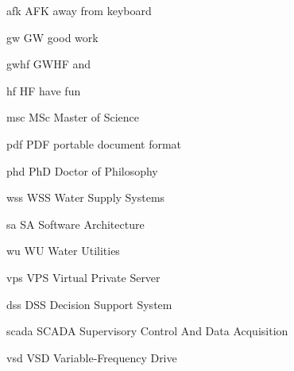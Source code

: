 \newabbreviation
{afk}
{AFK}
{away from keyboard}

\newabbreviation
{gw}
{GW}
{good work}

\newabbreviation
{gwhf}
{GWHF}
{ and }

\newabbreviation
{hf}
{HF}
{have fun}

\newabbreviation
{msc}
{MSc}
{Master of Science}

\newabbreviation
{pdf}
{PDF}
{portable document format}

\newabbreviation
{phd}
{PhD}
{Doctor of Philosophy}

\newabbreviation
{wss}
{WSS}
{Water Supply Systems}

\newabbreviation
{sa}
{SA}
{Software Architecture}

\newabbreviation
{wu}
{WU}
{Water Utilities}

\newabbreviation
{vps}
{VPS}
{Virtual Private Server}

\newabbreviation
{dss}
{DSS}
{Decision Support System}

\newabbreviation
{scada}
{SCADA}
{Supervisory Control And Data Acquisition}

\newabbreviation
{vsd}
{VSD}
{Variable-Frequency Drive}

